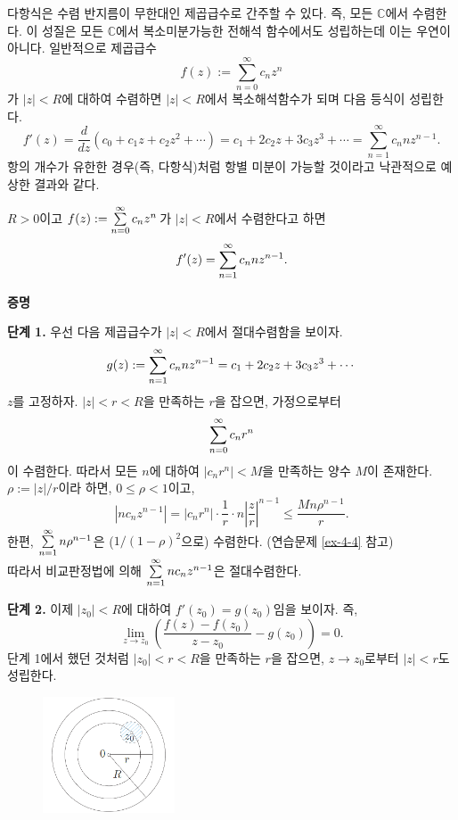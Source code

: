 다항식은 수렴 반지름이 무한대인 제곱급수로 간주할 수 있다.
즉, 모든 $\mathbb C$에서 수렴한다.
이 성질은 모든 $\mathbb C$에서 복소미분가능한 전해석 함수에서도 성립하는데
이는 우연이 아니다.
일반적으로 제곱급수 
\[
f(z):= \sum_{n=0}^\infty c_nz^n
\]
가 $|z|<R$에 대하여 수렴하면
$|z|<R$에서 복소해석함수가 되며 
다음 등식이 성립한다.
\[
f'(z) = \dfrac d{dz} (c_0+ c_1z + c_2z^2 + \cdots)
= c_1 + 2c_2z + 3c_3z^3 + \cdots 
= \sum_{n=1}^\infty c_n n z^{n-1}.
\]
항의 개수가 유한한 경우(즉, 다항식)처럼 
항별 미분이 가능할 것이라고 낙관적으로 예상한 결과와 같다.

\begin{salttheorem}{}{} \label{thm-4-3}
$R>0$이고 $f(z):= \sum\limits_{n=0}^\infty c_nz^n$\,가
$|z|<R$에서 수렴한다고 하면 \\[1ex]
\[
f'(z) = \sum\limits_{n=1}^\infty c_n n z^{n-1}.
\]
\end{salttheorem}

\newpage %

{\bf 증명}

{\bf 단계 1.}
우선 다음 제곱급수가 $|z|<R$에서 절대수렴함을 보이자.
\[
g(z):= \sum\limits_{n=1}^\infty c_n n z^{n-1}
=  c_1 + 2c_2z + 3c_3z^3 + \cdots
\]
$z$를 고정하자.
$|z|<r<R$을 만족하는 $r$을 잡으면, 가정으로부터
\[
\sum\limits_{n=0}^\infty c_nr^n
\]
이 수렴한다. 따라서 모든 $n$에 대하여
$|c_nr^n|<M$을 만족하는 양수 $M$이 존재한다.
$\rho:=|z|/r$이라 하면, $0\le \rho <1$이고,
\[
|nc_nz^{n-1}| = |c_nr^n| \cdot 
\dfrac1r \cdot n \left| \dfrac zr\right|^{n-1}
\le \dfrac{Mn\rho^{n-1}}r.
\]
한편, $\sum\limits_{n=1}^\infty n\rho^{n-1}$은 
($1/(1-\rho)^2$으로) 수렴한다. (연습문제 \ref{ex-4-4} 참고) \\
따라서 비교판정법에 의해
$\sum\limits_{n=1}^\infty nc_nz^{n-1}$은 절대수렴한다.

{\bf 단계 2.}
이제 $|z_0|<R$에 대하여 $f'(z_0) = g(z_0)$임을 보이자. 즉,
\[
\lim_{z\to z_0} \left(
\dfrac{f(z)-f(z_0)}{z-z_0} - g(z_0) \right) = 0.
\]
단계 1에서 했던 것처럼 $|z_0|<r<R$을 만족하는 $r$을 잡으면, 
$z\to z_0$로부터 $|z|<r$도 성립한다.

\begin{figure}[h!]
\begin{center}
\includegraphics[width=0.35\textwidth]{./SaltChapter/figs/fig-4-0-3}
\end{center}
\end{figure}

